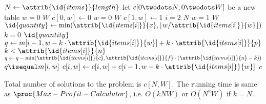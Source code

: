 \documentclass{article}
\newcommand{\floor}[1]{\left\lfloor #1 \right\rfloor}
\newcommand{\itemattr}[1]{\attrib{\id{items[i]}}{#1}}
\begin{document}
\begin{codebox}
\li $N \gets \attrib{\id{items}}{length}$
\li let $c[0 \twodots N, 0 \twodots W]$ be a new table
\li \For $w = 0$ \To $W$ \Do
\li 	$c[0, w] \gets 0$
	\End
\li \For $w = 0$ \To $W$ \Do
\li 	$c[1, w] \gets 1$
	\End
\li \For $i = 2$ \To $N$ \Do
\li 	\For $w = 1$ \To $W$ \Do
\li 		$\id{quantity} \gets \min(\itemattr{x}, \floor{w/\itemattr{w}})$
\li			\For $k = 0$ \To $\id{quantity}$ \Do
\li 			$q \gets m[i-1, w-k \cdot \itemattr{w}] + k \cdot \itemattr{p}$
\li 			\If $k < \itemattr{n}$ \Then
\li 				$q \gets q - \min(\itemattr{c}, \itemattr{f} \cdot (\itemattr{n} - k))$
				\End
\li 			\If $q \isequal m[i, w]$ \Then
\li 				$c[i, w] \gets c[i, w] + c[i-1, w-k \cdot \itemattr{w}]$
			\End
		\End		
	\End
\End
\li \Return $c$
\end{codebox}

Total number of solutions to the problem is $c[N, W]$. The running time is same as $\proc{Max-Profit-Calculator}$, i.e. $O(kNW)$ or $O(N^2W)$ if $k = N$.
\end{document}
